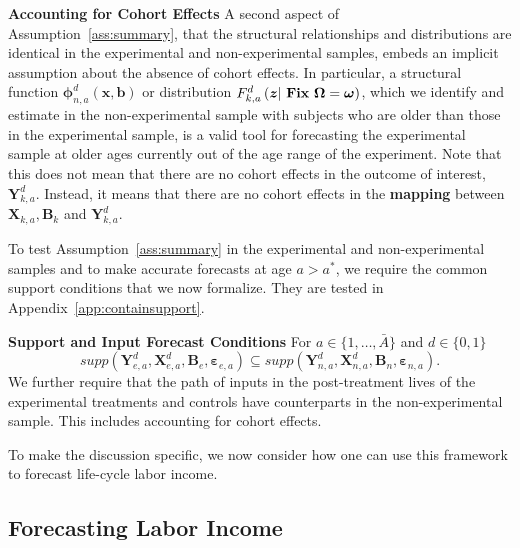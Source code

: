 \begin{remark} \label{remark:cohort} \textbf{Accounting for Cohort Effects}
A second aspect of Assumption~\ref{ass:summary}, that the structural relationships and distributions are identical in the experimental and non-experimental samples, embeds an implicit assumption about the absence of cohort effects. In particular, a structural function $\bm{\phi}_{n,a}^d \left( \bm{x}, \bm{b} \right)$ or distribution $F^d_{k,a} \left(\bm{z} | \text{ \text{\textbf{Fix}} } \bm{\Omega} = \bm{\omega}\right)$, which we identify and estimate in the non-experimental sample with subjects who are older than those in the experimental sample, is a valid tool for forecasting the experimental sample at older ages currently out of the age range of the experiment. Note that this does not mean that there are no cohort effects in the outcome of interest, $\bm{Y}^d_{k,a}$. Instead, it means that there are no cohort effects in the \textbf{mapping} between $\bm{X}_{k,a}, \bm{B}_k$ and $\bm{Y}_{k,a}^d$.
\end{remark}

\doublespacing
To test Assumption~\ref{ass:summary} in the experimental and non-experimental samples and to make accurate forecasts at age $a > a^*$, we require the common support conditions that we now formalize. They are tested in Appendix~\ref{app:containsupport}.

\onehalfspacing
\begin{assumption} \label{ass:contain} \textbf{Support and Input Forecast Conditions}
For $a \in \{ 1, \ldots, \bar{A} \}$ and $d \in \{0,1\}$
\begin{equation}
supp( \bm{Y}_{e,a}^d, \bm{X}^d_{e,a}, \bm{B}_e, \bm{\varepsilon}_{e,a} ) \subseteq supp( \bm{Y}_{n,a}^d, \bm{X}^d_{n,a}, \bm{B}_n, \bm{\varepsilon}_{n,a} ).
\end{equation}
We further require that the path of inputs in the post-treatment lives of the experimental treatments and controls have counterparts in the non-experimental sample. This includes accounting for cohort effects.
\end{assumption}

\doublespacing
To make the discussion specific, we now consider how one can use this framework to forecast life-cycle labor income.

\subsection{Forecasting Labor Income} \label{sec:forecasting}

